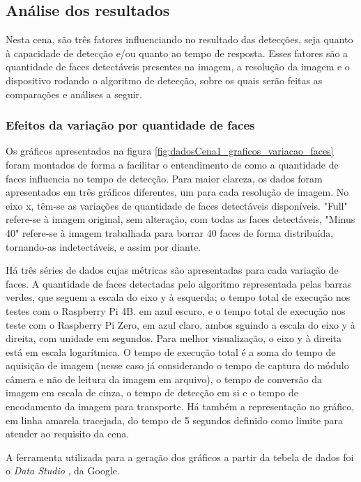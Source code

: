 \subsection{Análise dos resultados}
Nesta cena, são três fatores influenciando no resultado das detecções, seja quanto à capacidade de detecção e/ou quanto ao tempo de resposta. Esses fatores são a quantidade de faces detectáveis presentes na imagem, a resolução da imagem e o dispositivo rodando o algoritmo de detecção, sobre os quais serão feitas as comparações e análises a seguir.

\subsubsection{Efeitos da variação por quantidade de faces}

Os gráficos apresentados na figura \ref{fig:dadosCena1_graficos_variacao_faces} foram montados de forma a facilitar o entendimento de como a quantidade de faces influencia no tempo de detecção. Para maior clareza, os dados foram apresentados em três gráficos diferentes, um para cada resolução de imagem.
No eixo x, têm-se as variações de quantidade de faces detectáveis disponíveis. "Full" refere-se à imagem original, sem alteração, com todas as faces detectáveis, "Minus 40" refere-se à imagem trabalhada para borrar 40 faces de forma distribuída, tornando-as indetectáveis, e assim por diante.

Há três séries de dados cujas métricas são apresentadas para cada variação de faces. A quantidade de faces detectadas pelo algoritmo representada pelas barras verdes, que seguem a escala do eixo y à esquerda; o tempo total de execução nos testes com o Raspberry Pi 4B. em azul escuro, e o tempo total de execução nos teste com o Raspberry Pi Zero, em azul claro, ambos sguindo a escala do eixo y à direita, com unidade em segundos. Para melhor visualização, o eixo y à direita está em escala logarítmica.
O tempo de execução total é a soma do tempo de aquisição de imagem (nesse caso já considerando o tempo de captura do módulo câmera e não de leitura da imagem em arquivo), o tempo de conversão da imagem em escala de cinza, o tempo de detecção em si e o tempo de encodamento da imagem para transporte.
Há também a representação no gráfico, em linha amarela tracejada, do tempo de 5 segundos definido como limite para atender ao requisito da cena.

A ferramenta utilizada para a geração dos gráficos a partir da tebela de dados foi o \emph{Data Studio} \cite{DataStudio}, da Google.

